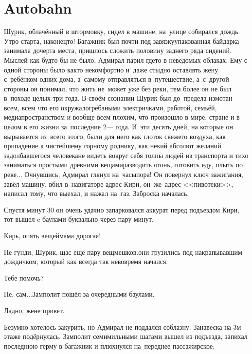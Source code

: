 \chapter{Autobahn}
\vepsianrose

Шурик, облачённый в штормовку, сидел в машине, на~улице собирался дождь. Утро старта, наконец\sdash то! Багажник был почти под завязку\mdash упакованная байдарка занимала дочерта места, пришлось сложить половину заднего ряда сидений. Мыслей как будто бы не было, Адмирал парил где\sdash то в неведомых облаках. Ему с одной стороны было как\sdash то некомфортно и~даже стыдно оставлять жену с~ребёнком одних дома, а~самому отправляться в~путешествие, а~с~другой стороны он понимал, что жить не~может уже без реки, тем более он не был в~походе целых три года. В своём сознании Шурик был до~предела измотан всем, всем что его окружало\mdash грёбаными электричками, работой, семьёй, медиапространством и вообще всем плохим, что произошло в мире, стране и в целом в его жизни за~последние 2\thinspace\nobreakdash--- года. И~эти десять дней, на которые он вырывается из~всего этого, были для него как глоток свежего воздуха, как припадение к чистейшему горному роднику, как некий абсолют желаний задолбавшегося человека\mdash не видеть вокруг себя толпы людей из транспорта и тихо заниматься простыми древними вещами\mdash разводить огонь, готовить еду, плыть по реке$\ldots$ Очнувшись, Адмирал глянул на~часы\mdash пора! Он повернул ключ зажигания, завёл машину, вбил в~навигаторе адрес Кири, он~же~адрес <<пивотеки>>, написал тому, что выехал, и нажал на~газ. Заброска началась.

Спустя минут 30 он очень удачно запарковался аккурат перед подъездом Кири, тот вышел c баулами буквально через пару минут.

\diagdash Кирь, опять вещей\mdash мама дорогая!

\diagdash Не гунди, Шурик, щас ещё пару вещмешков.\mdash они грузились под накрапывавшим дождичком, который как всегда так невовремя начался.

\diagdash Тебе помочь?

\diagdash Не, сам$\ldots$\mdash Замполит пошёл за очередными баулами.

\diagdash Ладно, жене привет.

Безумно хотелось закурить, но Адмирал не поддался соблазну. Занавеска на 3\sdash м этаже подёрнулась. Замполит семимильными шагами вышел из подъезда, запихал последнюю герму в багажник и плюхнулся на~переднее пассажирское:

